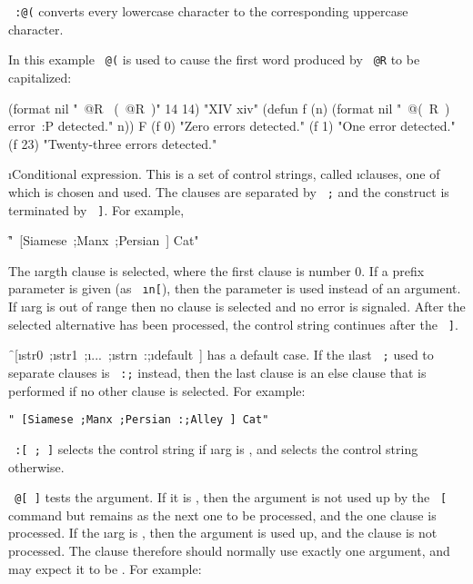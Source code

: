 {\tt ~:@(} converts every lowercase character
to the corresponding uppercase character.

In this example {\tt ~@(} is used to cause the first word
produced by {\tt ~@R} to be capitalized:

\code
 (format nil "~@R ~(~@R~)" 14 14) 
\EV "XIV xiv"
 (defun f (n) (format nil "~@(~R~) error~:P detected." n)) \EV F
 (f 0) \EV "Zero errors detected."
 (f 1) \EV "One error detected."
 (f 23) \EV "Twenty-three errors detected."
\endcode


\i{Conditional expression}.
This is a set of control strings, called \i{clauses}, one of which is
chosen and used.  The clauses are separated by {\tt ~;}
and the construct is terminated by {\tt ~]}.  For example,

\f{"~[Siamese~;Manx~;Persian~] Cat"}
                              
The \i{arg}th
clause is selected, where the first clause is number 0.
If a prefix parameter is given (as {\tt ~\i{n}[}),
then the parameter is used instead of an argument.    
If \i{arg} is out of range then no clause is selected
and no error is signaled.
After the selected alternative has been processed, the control string
continues after the {\tt ~]}.

\f{~[\i{str0}~;\i{str1}~;\i{...}~;\i{strn}~:;\i{default}~]}
has a default case.
If the \i{last} {\tt ~;} used to separate clauses
is {\tt ~:;} instead, then the last clause is an else clause
that is performed if no other clause is selected.
For example:

{\tt "~[Siamese~;Manx~;Persian~:;Alley~] Cat"}

{\tt ~:[~;~]} 
selects the  control string if \i{arg} is ,
and selects the  control string otherwise.
                                                             
{\tt ~@[~]} 
tests the argument.  If it is ,           
then the argument is not used up by the {\tt ~[} command
but remains as the next one to be processed,
and the one clause  is processed.
If the \i{arg} is , then the argument is used up,
and the clause is not processed.
The clause therefore should normally use exactly one argument,
and may expect it to be .
For example:

